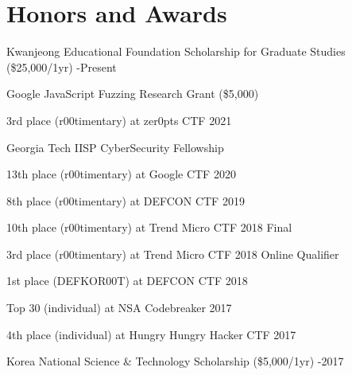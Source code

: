 \section*{Honors and Awards}
\begin{description}

  \item Kwanjeong Educational Foundation Scholarship for Graduate Studies (\$25,000/1yr) 
  -Present

  \item Google JavaScript Fuzzing Research Grant (\$5,000) 

  \item 3rd place (r00timentary) at zer0pts CTF 2021

  \item Georgia Tech IISP CyberSecurity Fellowship

  \item 13th place (r00timentary) at Google CTF 2020

  \item 8th place (r00timentary) at DEFCON CTF 2019
  
  \item 10th place (r00timentary) at Trend Micro CTF 2018 Final

  \item 3rd place (r00timentary) at Trend Micro CTF 2018 Online Qualifier

  \item 1st place (DEFKOR00T) at DEFCON CTF 2018

  \item Top 30 (individual) at NSA Codebreaker 2017

  \item 4th place (individual) at Hungry Hungry Hacker CTF 2017
  
  \item Korea National Science \& Technology Scholarship (\$5,000/1yr) 
  -2017

\end{description}
